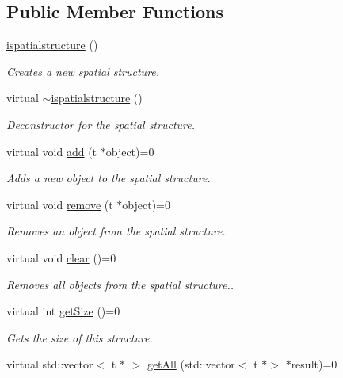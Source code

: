 \subsection*{Public Member Functions}
\begin{DoxyCompactItemize}
\item 
\hyperlink{classflounder_1_1ispatialstructure_a0dbd26803384536ee69667f057b0d436}{ispatialstructure} ()
\begin{DoxyCompactList}\small\item\em Creates a new spatial structure. \end{DoxyCompactList}\item 
virtual \hyperlink{classflounder_1_1ispatialstructure_a355b10082dc172d15e1adbadba6c7f2b}{$\sim$ispatialstructure} ()
\begin{DoxyCompactList}\small\item\em Deconstructor for the spatial structure. \end{DoxyCompactList}\item 
virtual void \hyperlink{classflounder_1_1ispatialstructure_aaab8169c14104918fa96cca1a6d6700f}{add} (t $\ast$object)=0
\begin{DoxyCompactList}\small\item\em Adds a new object to the spatial structure. \end{DoxyCompactList}\item 
virtual void \hyperlink{classflounder_1_1ispatialstructure_a28ec931fce23b42227a8deac1c576ed3}{remove} (t $\ast$object)=0
\begin{DoxyCompactList}\small\item\em Removes an object from the spatial structure. \end{DoxyCompactList}\item 
virtual void \hyperlink{classflounder_1_1ispatialstructure_a422fac0231ea3095e2f85951259a4686}{clear} ()=0
\begin{DoxyCompactList}\small\item\em Removes all objects from the spatial structure.. \end{DoxyCompactList}\item 
virtual int \hyperlink{classflounder_1_1ispatialstructure_a9daf7778a9bde304e08070eaeffb8fbd}{get\+Size} ()=0
\begin{DoxyCompactList}\small\item\em Gets the size of this structure. \end{DoxyCompactList}\item 
virtual std\+::vector$<$ t $\ast$ $>$ \hyperlink{classflounder_1_1ispatialstructure_a34a6ce64313ee41c5c188c9359997798}{get\+All} (std\+::vector$<$ t $\ast$$>$ $\ast$result)=0
$$
\end{DoxyCompactItemize}
